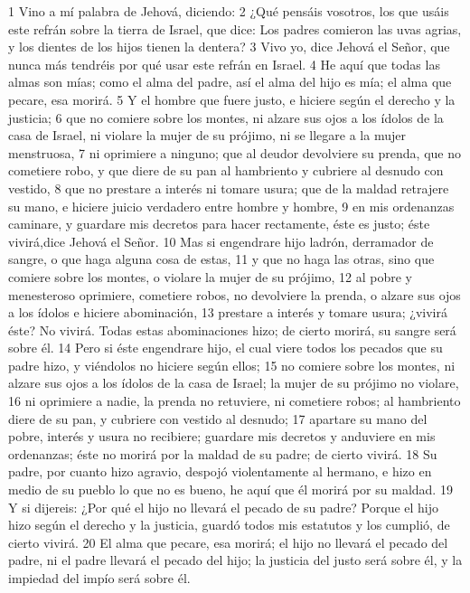 1 Vino a mí palabra de Jehová, diciendo:
2 ¿Qué pensáis vosotros, los que usáis este refrán sobre la tierra de Israel, que dice: Los padres comieron las uvas agrias, y los dientes de los hijos tienen la dentera?
3 Vivo yo, dice Jehová el Señor, que nunca más tendréis por qué usar este refrán en Israel.
4 He aquí que todas las almas son mías; como el alma del padre, así el alma del hijo es mía; el alma que pecare, esa morirá.
5 Y el hombre que fuere justo, e hiciere según el derecho y la justicia;
6 que no comiere sobre los montes, ni alzare sus ojos a los ídolos de la casa de Israel, ni violare la mujer de su prójimo, ni se llegare a la mujer menstruosa,
7 ni oprimiere a ninguno; que al deudor devolviere su prenda, que no cometiere robo, y que diere de su pan al hambriento y cubriere al desnudo con vestido,
8 que no prestare a interés ni tomare usura; que de la maldad retrajere su mano, e hiciere juicio verdadero entre hombre y hombre,
9 en mis ordenanzas caminare, y guardare mis decretos para hacer rectamente, éste es justo; éste vivirá,dice Jehová el Señor.
10 Mas si engendrare hijo ladrón, derramador de sangre, o que haga alguna cosa de estas,
11 y que no haga las otras, sino que comiere sobre los montes, o violare la mujer de su prójimo,
12 al pobre y menesteroso oprimiere, cometiere robos, no devolviere la prenda, o alzare sus ojos a los ídolos e hiciere abominación,
13 prestare a interés y tomare usura; ¿vivirá éste? No vivirá. Todas estas abominaciones hizo; de cierto morirá, su sangre será sobre él.
14 Pero si éste engendrare hijo, el cual viere todos los pecados que su padre hizo, y viéndolos no hiciere según ellos;
15 no comiere sobre los montes, ni alzare sus ojos a los ídolos de la casa de Israel; la mujer de su prójimo no violare,
16 ni oprimiere a nadie, la prenda no retuviere, ni cometiere robos; al hambriento diere de su pan, y cubriere con vestido al desnudo;
17 apartare su mano del pobre, interés y usura no recibiere; guardare mis decretos y anduviere en mis ordenanzas; éste no morirá por la maldad de su padre; de cierto vivirá.
18 Su padre, por cuanto hizo agravio, despojó violentamente al hermano, e hizo en medio de su pueblo lo que no es bueno, he aquí que él morirá por su maldad.
19 Y si dijereis: ¿Por qué el hijo no llevará el pecado de su padre? Porque el hijo hizo según el derecho y la justicia, guardó todos mis estatutos y los cumplió, de cierto vivirá.
20 El alma que pecare, esa morirá; el hijo no llevará el pecado del padre, ni el padre llevará el pecado del hijo; la justicia del justo será sobre él, y la impiedad del impío será sobre él.

